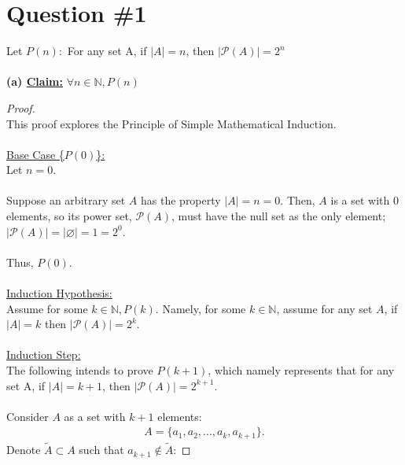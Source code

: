 \documentclass[12pt]{article}
\begin{document}
\renewcommand{\familydefault}{\rmdefault}



\pagebreak
\normalsize


\section*{Question \#1}
Let $P(n):$ For any set A, if $|A| = n$, then $|\mathcal{P}(A)| = 2^n$ \\
\\
\textbf{(a) \underline{Claim:}} $\forall n \in \mathbb{N}, P(n)$
\begin{proof}
    \leavevmode\\
    This proof explores the Principle of Simple Mathematical Induction. \\
    \\
    \underline{Base Case \{$P(0)$\}:} \\
    Let $n = 0$. \\
    \\
    Suppose an arbitrary set $A$ has the property $|A| = n = 0$. Then, $A$ is a set with $0$ elements, so its power set, $\mathcal{P}(A)$, must have the null set as the only element; $|\mathcal{P}(A)| = |{\varnothing}| = 1 = 2^0$. \\
    \\
    Thus, $P(0)$. \\
    \\
    \underline{Induction Hypothesis:} \\
    Assume for some $k \in \mathbb{N}, P(k)$. Namely, for some $k \in \mathbb{N}$, assume for any set $A$, if $|A| = k$ then $|\mathcal{P}(A)| = 2^k$. \\
    \\
    \underline{Induction Step:} \\
    The following intends to prove $P(k+1)$, which namely represents that for any set A, if $|A| = k + 1$, then $|\mathcal{P}(A)| = 2^{k+1}$. \\
    \\
    Consider $A$ as a set with $k + 1$ elements:
    \begin{equation*}
        \begin{aligned}
            A = \{a_1, a_2, ..., a_k, a_{k+1}\}\text{.}
        \end{aligned}
    \end{equation*}
    Denote $\widetilde{A} \subset A$ such that $a_{k+1} \notin \widetilde{A}$:

\end{proof}
\end{document}
